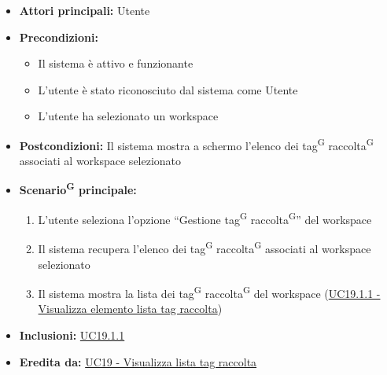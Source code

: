 \documentclass[a4paper, 11pt]{article}
\begin{document}
\begin{itemize}
	\item \textbf{Attori principali:} Utente
	\item \textbf{Precondizioni:} 
	\begin{itemize}
		\item Il sistema è attivo e funzionante
		\item L'utente è stato riconosciuto dal sistema come Utente
		\item L'utente ha selezionato un workspace
	\end{itemize}
	\item \textbf{Postcondizioni:} Il sistema mostra a schermo l'elenco dei tag\textsuperscript{G} raccolta\textsuperscript{G} associati al workspace selezionato
	\item \textbf{Scenario\textsuperscript{G} principale:}
	\begin{enumerate}
		\item L'utente seleziona l'opzione “Gestione tag\textsuperscript{G} raccolta\textsuperscript{G}” del workspace
		\item Il sistema recupera l'elenco dei tag\textsuperscript{G} raccolta\textsuperscript{G} associati al workspace selezionato
		\item Il sistema mostra la lista dei tag\textsuperscript{G} raccolta\textsuperscript{G} del workspace (\hyperref[UC19.1.1]{UC19.1.1 - Visualizza elemento lista tag raccolta})
	\end{enumerate}
	\item \textbf{Inclusioni:} \hyperref[UC19.1.1]{UC19.1.1}
	\item \textbf{Eredita da:} \hyperref[UC19]{UC19 - Visualizza lista tag raccolta}
\end{itemize}
\end{document}
